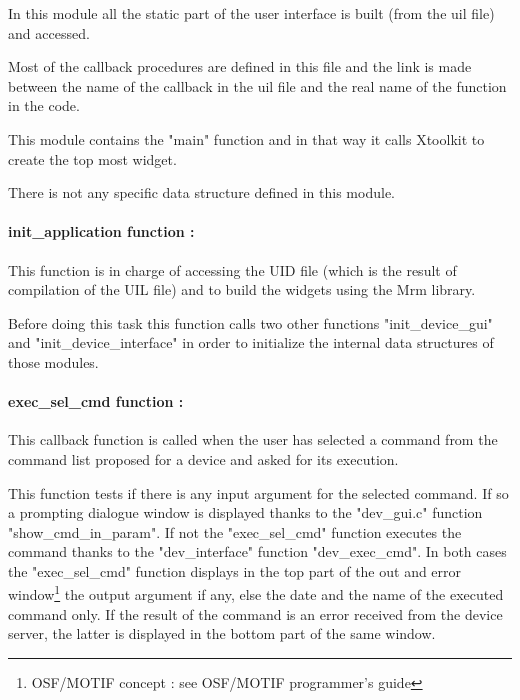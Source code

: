 %
%
%
%
%
%
%
%
%
%
In this module all the static part of the user interface is built (from the uil
file) and accessed.

Most of the callback procedures are defined in this file and the link is made
between the name of the callback in the uil file and the real name of the
function in the code.

This module contains the "main" function and in that way it calls Xtoolkit
to create the top most widget. 

There is not any specific data structure defined in this module.

\paragraph{init\_application function : }

This function is in charge of accessing the UID file (which is the result of
compilation of the UIL file) and to build the widgets using the Mrm library.

Before doing this task this function calls two other functions
"init\_device\_gui" and "init\_device\_interface" in order to initialize the
internal data structures of those modules.


\paragraph{exec\_sel\_cmd function : }

This callback function is called when the user has selected a command from the
command list proposed for a device and asked for its execution.

This function tests if there is any input argument for the selected command.
If so a prompting dialogue window is displayed thanks to the "dev\_gui.c"
function "show\_cmd\_in\_param". 
If not the "exec\_sel\_cmd" function executes
the command thanks to the "dev\_interface" function "dev\_exec\_cmd". In both
cases the "exec\_sel\_cmd" function displays in the top part of the out and  
error window\footnote[1]{ OSF/MOTIF concept : see OSF/MOTIF programmer's guide } 
the output argument if any, else the date and the name of the executed 
command only. If the result of the command is an error received from the
device server, the latter is displayed in the bottom part of the same 
window.


